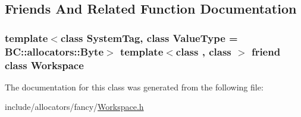 \subsection{Friends And Related Function Documentation}
\subsubsection[{\texorpdfstring{Workspace}{Workspace}}]{\setlength{\rightskip}{0pt plus 5cm}template$<$class System\+Tag, class Value\+Type = B\+C\+::allocators\+::\+Byte$>$ template$<$class , class $>$ friend class {\bf Workspace}\hspace{0.3cm}{\ttfamily [friend]}}\hypertarget{classBC_1_1allocators_1_1fancy_1_1Workspace_a7a3ab453bfe60cd714a4ff1f88cdb79b}{}\label{classBC_1_1allocators_1_1fancy_1_1Workspace_a7a3ab453bfe60cd714a4ff1f88cdb79b}


The documentation for this class was generated from the following file\+:\begin{DoxyCompactItemize}
\item 
include/allocators/fancy/\hyperlink{Workspace_8h}{Workspace.\+h}\end{DoxyCompactItemize}
